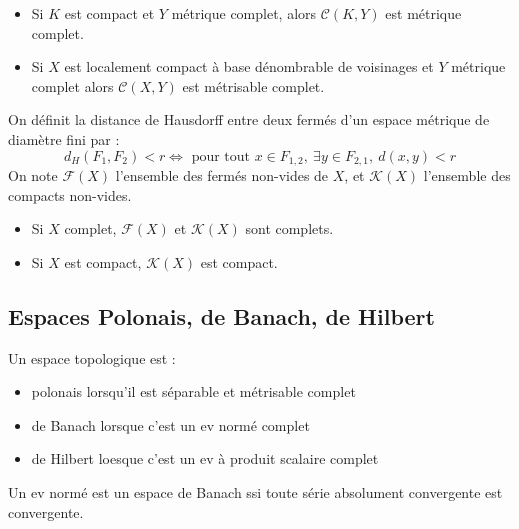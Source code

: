\documentclass{cours}
\begin{document}
\begin{theorem}
    \begin{itemize}
        \item Si $K$ est compact et $Y$ métrique complet, alors $\mathcal{C}(K, Y)$ est métrique complet.
        \item Si $X$ est localement compact à base dénombrable de voisinages et $Y$ métrique complet alors $\mathcal{C}(X, Y)$ est métrisable complet.
    \end{itemize}
\end{theorem}


\begin{definition}
    On définit la distance de Hausdorff entre deux fermés d'un espace métrique de diamètre fini par : 
    \[d_{H}(F_{1}, F_{2}) < r \Leftrightarrow \text{ pour tout } x \in F_{1, 2},\ \exists y \in  F_{2, 1},\ d(x, y) < r\]
    On note $\mathcal{F}(X)$ l'ensemble des fermés non-vides de $X$, et $\mathcal{K}(X)$ l'ensemble des compacts non-vides.
\end{definition}

\begin{theorem}
    \begin{itemize}
        \item Si $X$ complet, $\mathcal{F}(X)$ et $\mathcal{K}(X)$ sont complets.
        \item Si $X$ est compact, $\mathcal{K}(X)$ est compact.
    \end{itemize}
\end{theorem}


\subsection{Espaces Polonais, de Banach, de Hilbert}
\begin{definition}
    Un espace topologique est :
    \begin{itemize}
        \item polonais lorsqu'il est séparable et métrisable complet
        \item de Banach lorsque c'est un ev normé complet
        \item de Hilbert loesque c'est un ev à produit scalaire complet
    \end{itemize}
\end{definition}

\begin{theorem}
    Un ev normé est un espace de Banach ssi toute série absolument convergente est convergente.
\end{theorem}
\end{document}
